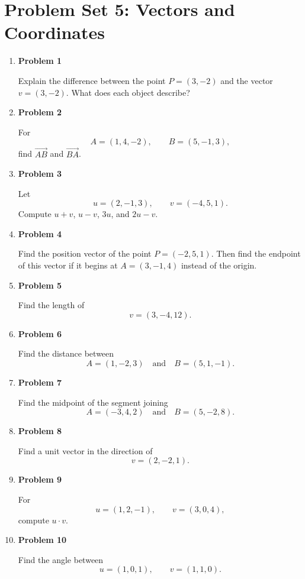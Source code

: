 \section{Problem Set 5: Vectors and Coordinates}

\begin{enumerate}
\item \textbf{Problem 1}\par
Explain the difference between the point \(P=(3,-2)\) and the vector \(v=(3,-2)\). What does each object describe?

\item \textbf{Problem 2}\par
For
\[
A=(1,4,-2),
\qquad
B=(5,-1,3),
\]
find \(\overrightarrow{AB}\) and \(\overrightarrow{BA}\).

\item \textbf{Problem 3}\par
Let
\[
u=(2,-1,3),
\qquad
v=(-4,5,1).
\]
Compute \(u+v\), \(u-v\), \(3u\), and \(2u-v\).

\item \textbf{Problem 4}\par
Find the position vector of the point \(P=(-2,5,1)\). Then find the endpoint of this vector if it begins at \(A=(3,-1,4)\) instead of the origin.

\item \textbf{Problem 5}\par
Find the length of
\[
v=(3,-4,12).
\]

\item \textbf{Problem 6}\par
Find the distance between
\[
A=(1,-2,3)
\quad\text{and}\quad
B=(5,1,-1).
\]

\item \textbf{Problem 7}\par
Find the midpoint of the segment joining
\[
A=(-3,4,2)
\quad\text{and}\quad
B=(5,-2,8).
\]

\item \textbf{Problem 8}\par
Find a unit vector in the direction of
\[
v=(2,-2,1).
\]

\item \textbf{Problem 9}\par
For
\[
u=(1,2,-1),
\qquad
v=(3,0,4),
\]
compute \(u\cdot v\).

\item \textbf{Problem 10}\par
Find the angle between
\[
u=(1,0,1),
\qquad
v=(1,1,0).
\]


\end{enumerate}
